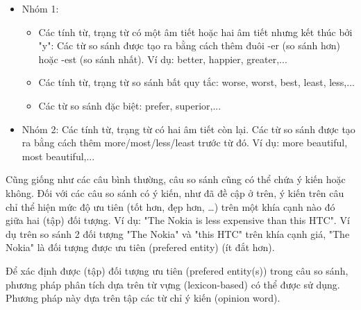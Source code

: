 \documentclass[12pt]{report}
\begin{document}
				\begin{itemize}
					\item{Nhóm 1:}		
					\begin{itemize}	
						\item{Các tính từ, trạng từ có một âm tiết hoặc hai âm tiết nhưng kết thúc bởi "y": Các từ so sánh được tạo ra bằng cách thêm đuôi -er (so sánh hơn) hoặc -est (so sánh nhất). Ví dụ: better, happier, greater,...}
						\item{Các tính từ, trạng từ so sánh bất quy tắc: worse, worst, best, least, less,...}		
						\item{Các từ so sánh đặc biệt: prefer, superior,...}
					\end{itemize}
					\item{Nhóm 2: Các tính từ, trạng từ có hai âm tiết còn lại. Các từ so sánh được tạo ra bằng cách thêm more/most/less/least trước từ đó. Ví dụ: more beautiful, most beautiful,...}					
				\end{itemize}
				\par Cũng giống như các câu bình thường, câu so sánh cũng có thể chứa ý kiến hoặc không. Đối với các câu so sánh có ý kiến, như đã đề cập ở trên, ý kiến trên câu chỉ thể hiện mức độ ưu tiên (tốt hơn, đẹp hơn, …) trên một khía cạnh nào đó giữa hai (tập) đối tượng. Ví dụ: "The Nokia is less expensive than this HTC". Ví dụ trên so sánh 2 đối tượng "The Nokia" và "this HTC" trên khía cạnh giá, "The Nokia" là đối tượng được ưu tiên (prefered entity) (ít đắt hơn). 
				\par Để xác định được (tập) đối tượng ưu tiên (prefered entity(s)) trong câu so sánh, phương pháp phân tích dựa trên từ vựng (lexicon-based) có thể được sử dụng. Phương pháp này dựa trên tập các từ chỉ ý kiến (opinion word).
\end{document}
